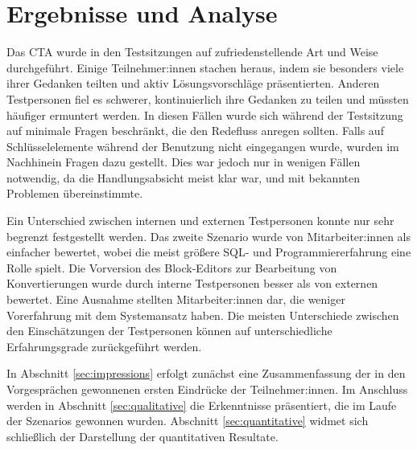 \section{Ergebnisse und Analyse}


Das \ac{CTA} wurde in den Testsitzungen auf zufriedenstellende Art und Weise durchgeführt. Einige Teilnehmer:innen stachen heraus, indem sie besonders viele ihrer Gedanken teilten und aktiv Lösungsvorschläge präsentierten. Anderen Testpersonen fiel es schwerer, kontinuierlich ihre Gedanken zu teilen und müssten häufiger ermuntert werden. In diesen Fällen wurde sich während der Testsitzung auf minimale Fragen beschränkt, die den Redefluss anregen sollten. Falls auf Schlüsselelemente während der Benutzung nicht eingegangen wurde, wurden im Nachhinein Fragen dazu gestellt. Dies war jedoch nur in wenigen Fällen notwendig, da die Handlungsabsicht meist klar war, und mit bekannten Problemen übereinstimmte.

Ein Unterschied zwischen internen und externen Testpersonen konnte nur sehr begrenzt festgestellt werden. Das zweite Szenario wurde von Mitarbeiter:innen als einfacher bewertet, wobei die meist größere \ac{SQL}- und Programmiererfahrung eine Rolle spielt. Die Vorversion des Block-Editors zur Bearbeitung von Konvertierungen wurde durch interne Testpersonen besser als von externen bewertet. Eine Ausnahme stellten Mitarbeiter:innen dar, die weniger Vorerfahrung mit dem Systemansatz haben. Die meisten Unterschiede zwischen den Einschätzungen der Testpersonen können auf unterschiedliche  Erfahrungsgrade zurückgeführt werden.

In Abschnitt \ref{sec:impressions} erfolgt zunächst eine Zusammenfassung der in den Vorgesprächen gewonnenen ersten Eindrücke der Teilnehmer:innen. Im Anschluss werden in Abschnitt \ref{sec:qualitative} die Erkenntnisse präsentiert, die im Laufe der Szenarios gewonnen wurden. Abschnitt \ref{sec:quantitative} widmet sich schließlich der Darstellung der quantitativen Resultate.
